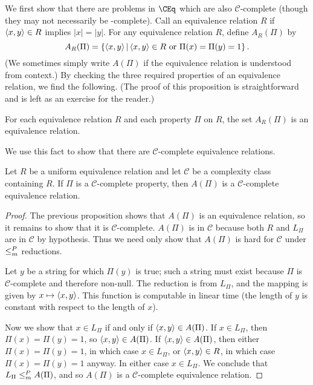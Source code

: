 We first show that there are problems in $\CEq$ which are also $\mathcal{C}$-complete (though they may not necessarily be \CEq-complete).
Call an equivalence relation $R$  if $\left\langle x,y\right\rangle \in R$ implies $|x| = |y|$.
For any equivalence relation $R$, define $A_R(\Pi)$ by
\begin{displaymath}
  A_R(\Pi) = \left\{ \left\langle x,y\right\rangle\,\middle|\, \left\langle x,y\right\rangle \in R \text{ or } \Pi(x) = \Pi(y) = 1\right\}.
\end{displaymath}
(We sometimes simply write $A(\Pi)$ if the equivalence relation is understood from context.)
By checking the three required properties of an equivalence relation, we find the following.
(The proof of this proposition is straightforward and is left as an exercise for the reader.)
\begin{proposition}
  For each equivalence relation $R$ and each property $\Pi$ on $R$, the set $A_R(\Pi)$ is an equivalence relation.
\end{proposition}
We use this fact to show that there are $\mathcal{C}$-complete equivalence relations.
\begin{proposition}\label{prop:APi}
  Let $R$ be a uniform equivalence relation and let $\mathcal{C}$ be a complexity class containing $R$.
  If $\Pi$ is a $\mathcal{C}$-complete property, then $A(\Pi)$ is a $\mathcal{C}$-complete equivalence relation.
\end{proposition}
\begin{proof}
  The previous proposition shows that $A(\Pi)$ is an equivalence relation, so it remains to show that it is $\mathcal{C}$-complete.
  $A(\Pi)$ is in $\mathcal{C}$ because both $R$ and $L_\Pi$ are in $\mathcal{C}$ by hypothesis.
  Thus we need only show that $A(\Pi)$ is hard for $\mathcal{C}$ under $\leq^{P}_{m}$ reductions.

  Let $y$ be a string for which $\Pi(y)$ is true; such a string must exist because $\Pi$ is $\mathcal{C}$-complete and therefore non-null.
  The reduction is from $L_\Pi$, and the mapping is given by $x \mapsto \left\langle x,y\right\rangle$.
  This function is computable in linear time (the length of $y$ is constant with respect to the length of $x$).

  Now we show that $x \in L_\Pi$ if and only if $\left\langle x,y\right\rangle \in A(\Pi)$.
  If $x \in L_\Pi$, then $\Pi(x) = \Pi(y) = 1$, so $\left\langle x,y\right\rangle \in A(\Pi)$.
  If $\left\langle x,y\right\rangle \in A(\Pi)$, then either $\Pi(x) = \Pi(y) = 1$, in which case $x \in L_\Pi$, or $\left\langle x,y\right\rangle \in R$, in which case $\Pi(x) = \Pi(y) = 1$ anyway.
  In either case $x \in L_\Pi$.
  We conclude that $L_\Pi \leq^{P}_{m} A(\Pi)$, and so $A(\Pi)$ is a $\mathcal{C}$-complete equivalence relation.
\end{proof}

